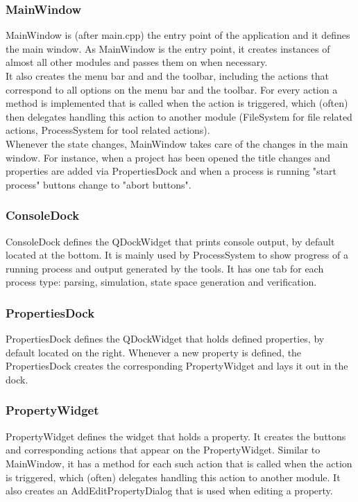 \documentclass[a4paper, fleqn]{article}
\begin{document}
\subsubsection*{MainWindow}
MainWindow is (after main.cpp) the entry point of the application and it defines the main window. As MainWindow is the entry point, it creates instances of almost all other modules and passes them on when necessary.\\
It also creates the menu bar and and the toolbar, including the actions that correspond to all options on the menu bar and the toolbar. For every action a method is implemented that is called when the action is triggered, which (often) then delegates handling this action to another module (FileSystem for file related actions, ProcessSystem for tool related actions).\\
Whenever the state changes, MainWindow takes care of the changes in the main window. For instance, when a project has been opened the title changes and properties are added via PropertiesDock and when a process is running "start process" buttons change to "abort buttons".

\subsubsection*{ConsoleDock}
ConsoleDock defines the QDockWidget that prints console output, by default located at the bottom. It is mainly used by ProcessSystem to show progress of a running process and output generated by the tools. It has one tab for each process type: parsing, simulation, state space generation and verification.

\subsubsection*{PropertiesDock}
PropertiesDock defines the QDockWidget that holds defined properties, by default located on the right. Whenever a new property is defined, the PropertiesDock creates the corresponding PropertyWidget and lays it out in the dock.

\subsubsection*{PropertyWidget}
PropertyWidget defines the widget that holds a property. It creates the buttons and corresponding actions that appear on the PropertyWidget. Similar to MainWindow, it has a method for each such action that is called when the action is triggered, which (often) delegates handling this action to another module. It also creates an AddEditPropertyDialog that is used when editing a property.
\end{document}
